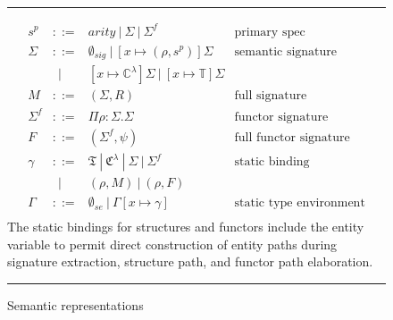\begin{figure}
	\hrule
\[\begin{array}{rcll}
       s^p & ::= &  arity~|~\Sigma~|~\Sigma^f& \textrm{primary spec}\\
       \Sigma & ::= & \emptyset_{sig}~|~[x\mapsto (\rho,
       s^p)]\Sigma & \textrm{semantic signature}\\
       & ~~| & [x\mapsto \mathbb{C}^\lambda]\Sigma~|~[x\mapsto
       \mathbb{T}]\Sigma \\ 
	M & ::= & (\Sigma, R) & \textrm{full signature}\\
        \Sigma^f & ::= & \Pi\rho:\Sigma.\Sigma & \textrm{functor signature}\\
	F & ::= & (\Sigma^f, \psi) & \textrm{full functor signature}\\
        \gamma & ::= &
        \mathfrak{T}~|~\mathfrak{C}^\lambda~|~\Sigma~|~\Sigma^f & \textrm{static binding}\\
        & ~~| & (\rho, M)~|~(\rho,
        F) \\
	\Gamma & ::= & \emptyset_{se}~|~\Gamma[x\mapsto \gamma] &
        \textrm{static type environment}\\
\end{array}\]
The static bindings for structures and functors include the entity
variable to permit direct construction of entity paths during
signature extraction, structure path, and functor path elaboration.  
\hrule
\caption{Semantic representations}
\label{fig:semanticobjs}
\end{figure}